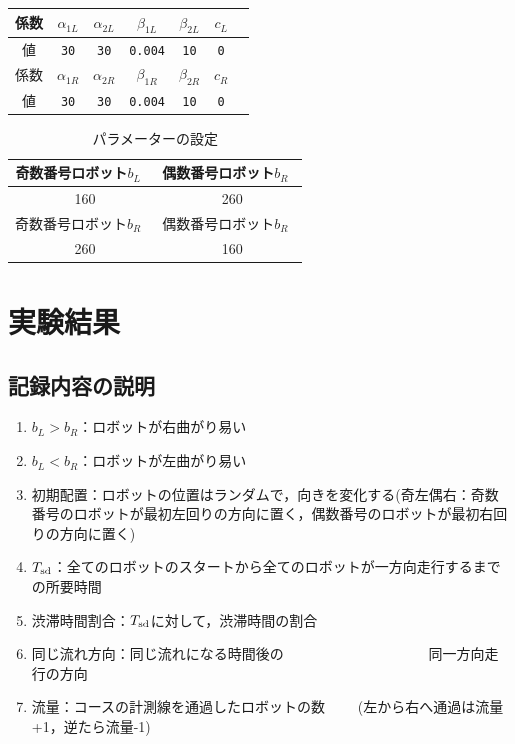 \documentclass[twocolumn]{jarticle} %
\begin{document}
\begin{table}[!htb]
\begin{center}
\begin{tabular}{|c|c|c|c|c|c|c|}
\hline
係数 & $\alpha_{1L}$ & $\alpha_{2L}$ & $\beta_{1L}$ & $\beta_{2L}$ & $c_L$ \\
\hline
値 & \verb|30| & \verb|30| & \verb|0.004| & \verb|10| & \verb|0| \\
\hline
係数 & $\alpha_{1R}$ & $\alpha_{2R}$ & $\beta_{1R}$ & $\beta_{2R}$ & $c_R$ \\
\hline
値 & \verb|30|& \verb|30| & \verb|0.004| & \verb|10| & \verb|0| \\
\hline
\end{tabular}
\end{center}
\end{table}

\begin{table}[!htb]
\begin{center}
\begin{tabular}{|c|c|}
\hline
 奇数番号ロボット$b_L$ & 偶数番号ロボット$b_R$　\\
\hline
　160　&　260　\\
\hline
 奇数番号ロボット$b_R$ & 偶数番号ロボット$b_R$　\\
\hline
　260　&　160　\\
\hline
\end{tabular}
\end{center}
\caption{
パラメーターの設定
}
\end{table}


\section{実験結果}
\subsection{記録内容の説明}

\begin{enumerate}
\item $b_L>b_R$：ロボットが右曲がり易い
\item $b_L<b_R$：ロボットが左曲がり易い
\item 初期配置：ロボットの位置はランダムで，向きを変化する(奇左偶右：奇数番号のロボットが最初左回りの方向に置く，偶数番号のロボットが最初右回りの方向に置く)
\item $T_{\rm sd}$：全てのロボットのスタートから全てのロボットが一方向走行するまでの所要時間
\item 渋滞時間割合：$T_{\rm sd}$に対して，渋滞時間の割合
\item 同じ流れ方向：同じ流れになる時間後の
　　　　　　　　　　同一方向走行の方向
\item 流量：コースの計測線を通過したロボットの数
　　(左から右へ通過は流量+1，逆たら流量-1)
\end{enumerate}
\end{document}
